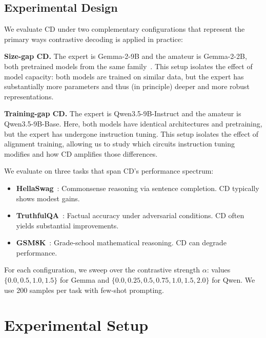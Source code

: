 \documentclass[11pt]{article}
\begin{document}
\subsection{Experimental Design}
\label{sec:exp-design}

We evaluate CD under two complementary configurations that represent the primary ways contrastive decoding is applied in practice:

\textbf{Size-gap CD.} The expert is Gemma-2-9B and the amateur is Gemma-2-2B, both pretrained models from the same family~\citep{team2024gemma}. This setup isolates the effect of model capacity: both models are trained on similar data, but the expert has substantially more parameters and thus (in principle) deeper and more robust representations.

\textbf{Training-gap CD.} The expert is Qwen3.5-9B-Instruct and the amateur is Qwen3.5-9B-Base. Here, both models have identical architectures and pretraining, but the expert has undergone instruction tuning. This setup isolates the effect of alignment training, allowing us to study which circuits instruction tuning modifies and how CD amplifies those differences.

We evaluate on three tasks that span CD's performance spectrum:
\begin{itemize}
    \item \textbf{HellaSwag}~\citep{zellers2019hellaswag}: Commonsense reasoning via sentence completion. CD typically shows modest gains.
    \item \textbf{TruthfulQA}~\citep{lin2022truthfulqa}: Factual accuracy under adversarial conditions. CD often yields substantial improvements.
    \item \textbf{GSM8K}~\citep{cobbe2021gsm8k}: Grade-school mathematical reasoning. CD can degrade performance.
\end{itemize}

For each configuration, we sweep over the contrastive strength $\alpha$: values $\{0.0, 0.5, 1.0, 1.5\}$ for Gemma and $\{0.0, 0.25, 0.5, 0.75, 1.0, 1.5, 2.0\}$ for Qwen. We use 200 samples per task with few-shot prompting.

\section{Experimental Setup}
\label{sec:exp-setup}
\end{document}
